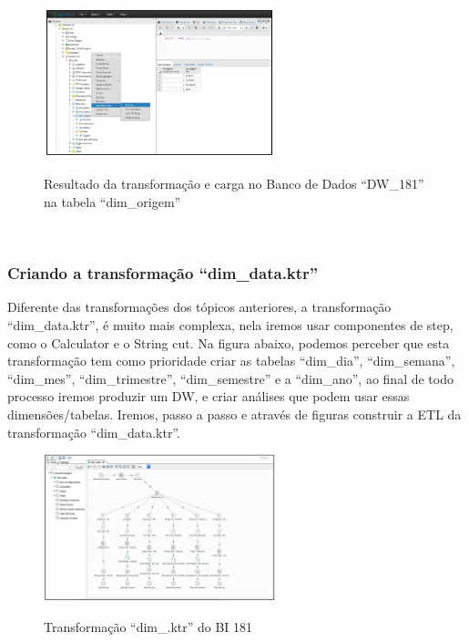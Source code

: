 \begin{figure}[H]
	\vspace*{0,2cm}
    \centering
    \caption{Resultado da transforma\c{c}\~{a}o e carga no Banco de Dados ``DW\_181'' na tabela ``dim\_origem''}
    \includegraphics[width=0.6\textwidth]{./04-figuras/figura-res-dim-origem}
    \label{fig:ilustfigresdimorigem}
\end{figure}
\vspace*{-0,9cm}
{\raggedright {}} \\

\subsubsection{Criando a transforma\c{c}\~{a}o ``dim\_data.ktr''}

Diferente das transforma\c{c}\~{o}es dos t\'{o}picos anteriores, a transforma\c{c}\~{a}o ``dim\_data.ktr'', 
\'{e} muito mais complexa, nela iremos usar componentes de step, como o Calculator e o String cut. 
Na figura abaixo, podemos perceber que esta transforma\c{c}\~{a}o tem como prioridade criar 
as tabelas ``dim\_dia'', ``dim\_semana'', ``dim\_mes'', ``dim\_trimestre'', ``dim\_semestre'' e 
a ``dim\_ano'', ao final de todo processo iremos produzir um DW, e criar an\'{a}lises que podem 
usar essas dimens\~{o}es/tabelas.
Iremos, passo a passo e atrav\'{e}s de figuras construir a ETL da transforma\c{c}\~{a}o ``dim\_data.ktr''.

\begin{figure}[H]
	\vspace*{0,2cm}
    \centering
    \caption{Transforma\c{c}\~{a}o ``dim\_\data.ktr'' do BI 181}
    \includegraphics[width=0.6\textwidth]{./04-figuras/figura-dim-data.png}
    \label{fig:ilustfigresdimdata}
\end{figure}
\vspace*{-0,9cm}
{\raggedright {}} \\

